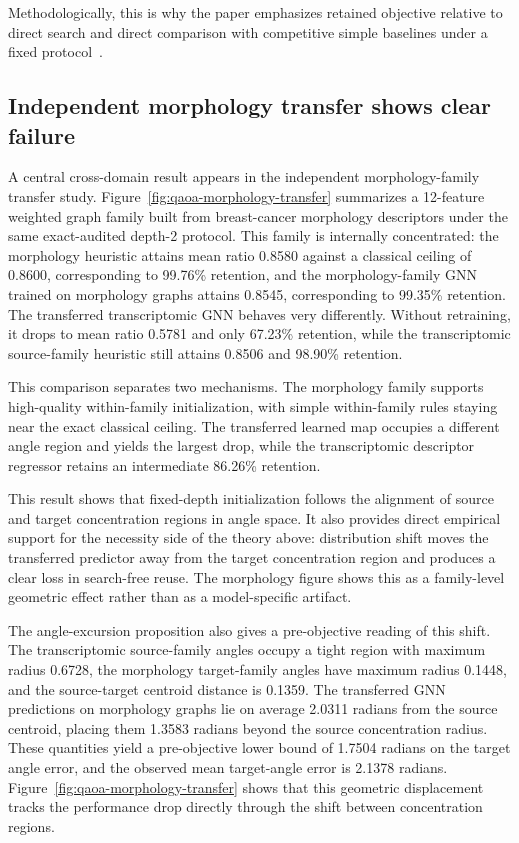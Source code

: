 \documentclass[
  reprint,
  twocolumn,
  aps,
  superscriptaddress,
  longbibliography,
  floatfix
]{revtex4-2}
\begin{document}
Methodologically, this is why the paper emphasizes retained objective relative to direct search and direct comparison with competitive simple baselines under a fixed protocol~\cite{dwivedi2020,you2020design}.

\subsection{Independent morphology transfer shows clear failure}
A central cross-domain result appears in the independent morphology-family transfer study. Figure~\ref{fig:qaoa-morphology-transfer} summarizes a 12-feature weighted graph family built from breast-cancer morphology descriptors under the same exact-audited depth-2 protocol. This family is internally concentrated: the morphology heuristic attains mean ratio 0.8580 against a classical ceiling of 0.8600, corresponding to 99.76\% retention, and the morphology-family GNN trained on morphology graphs attains 0.8545, corresponding to 99.35\% retention. The transferred transcriptomic GNN behaves very differently. Without retraining, it drops to mean ratio 0.5781 and only 67.23\% retention, while the transcriptomic source-family heuristic still attains 0.8506 and 98.90\% retention.

This comparison separates two mechanisms. The morphology family supports high-quality within-family initialization, with simple within-family rules staying near the exact classical ceiling. The transferred learned map occupies a different angle region and yields the largest drop, while the transcriptomic descriptor regressor retains an intermediate 86.26\% retention.

This result shows that fixed-depth initialization follows the alignment of source and target concentration regions in angle space. It also provides direct empirical support for the necessity side of the theory above: distribution shift moves the transferred predictor away from the target concentration region and produces a clear loss in search-free reuse. The morphology figure shows this as a family-level geometric effect rather than as a model-specific artifact.

The angle-excursion proposition also gives a pre-objective reading of this shift. The transcriptomic source-family angles occupy a tight region with maximum radius 0.6728, the morphology target-family angles have maximum radius 0.1448, and the source-target centroid distance is 0.1359. The transferred GNN predictions on morphology graphs lie on average 2.0311 radians from the source centroid, placing them 1.3583 radians beyond the source concentration radius. These quantities yield a pre-objective lower bound of 1.7504 radians on the target angle error, and the observed mean target-angle error is 2.1378 radians. Figure~\ref{fig:qaoa-morphology-transfer} shows that this geometric displacement tracks the performance drop directly through the shift between concentration regions.
\end{document}
